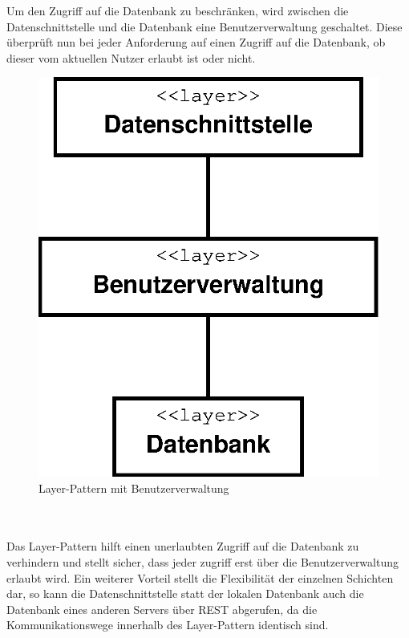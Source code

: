 Um den Zugriff auf die Datenbank zu beschränken, wird zwischen die Datenschnittstelle und die Datenbank eine Benutzerverwaltung geschaltet. Diese überprüft nun bei jeder Anforderung auf einen Zugriff auf die Datenbank, ob dieser vom aktuellen Nutzer erlaubt ist oder nicht.
\begin{figure}
	\vspace{-15pt}
\begin{center}
\includegraphics[width=1\linewidth]{Grafik/Diagramm/Layer}
\end{center}
\vspace{-15pt}
\caption[Layer-Klassen]{Layer-Pattern mit Benutzerverwaltung}
\label{fig:Layer}
\vspace{-35pt}
\end{figure}\\
\\
Das Layer-Pattern hilft einen unerlaubten Zugriff auf die Datenbank zu verhindern und stellt sicher, dass jeder zugriff erst über die Benutzerverwaltung erlaubt wird. Ein weiterer Vorteil stellt die Flexibilität der einzelnen Schichten dar, so kann die Datenschnittstelle statt der lokalen Datenbank auch die Datenbank eines anderen Servers über REST abgerufen, da die Kommunikationswege innerhalb des Layer-Pattern identisch sind.
\\